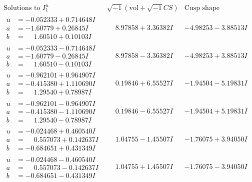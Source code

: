 \documentclass[1p]{elsarticle_modified}
\theoremstyle{definition}
\newcommand{\I}{\sqrt{-1}}
\begin{document}
$$\begin{array}{c|c|c}  
\text{Solutions to }I^u_{1}& \I (\text{vol} + \sqrt{-1}CS) & \text{Cusp shape}\\
 \hline 
\begin{aligned}
u &= -0.052333 + 0.714648 I \\
a &= -1.60779 + 0.26845 I \\
b &= \phantom{-}1.60510 + 0.10103 I\end{aligned}
 & \phantom{-}8.97858 + 3.36382 I & -4.98253 - 3.88513 I \\ \hline\begin{aligned}
u &= -0.052333 - 0.714648 I \\
a &= -1.60779 - 0.26845 I \\
b &= \phantom{-}1.60510 - 0.10103 I\end{aligned}
 & \phantom{-}8.97858 - 3.36382 I & -4.98253 + 3.88513 I \\ \hline\begin{aligned}
u &= -0.962101 + 0.964907 I \\
a &= -0.415380 + 1.110690 I \\
b &= \phantom{-}1.29540 + 0.78987 I\end{aligned}
 & \phantom{-}0.19846 + 6.55527 I & -1.94504 - 5.19831 I \\ \hline\begin{aligned}
u &= -0.962101 - 0.964907 I \\
a &= -0.415380 - 1.110690 I \\
b &= \phantom{-}1.29540 - 0.78987 I\end{aligned}
 & \phantom{-}0.19846 - 6.55527 I & -1.94504 + 5.19831 I \\ \hline\begin{aligned}
u &= -0.024468 + 0.460540 I \\
a &= \phantom{-}0.557073 + 0.142637 I \\
b &= -0.684651 + 0.431349 I\end{aligned}
 & \phantom{-}1.04755 - 1.45507 I & -1.76075 + 3.94050 I \\ \hline\begin{aligned}
u &= -0.024468 - 0.460540 I \\
a &= \phantom{-}0.557073 - 0.142637 I \\
b &= -0.684651 - 0.431349 I\end{aligned}
 & \phantom{-}1.04755 + 1.45507 I & -1.76075 - 3.94050 I \\ \hline\begin{aligned}

\end{aligned}
\end{array}$$
\end{document}
